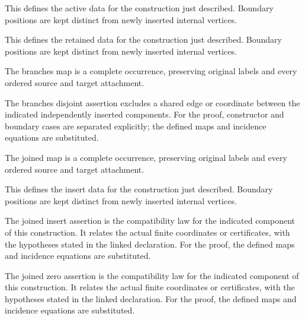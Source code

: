 This defines the active data for the construction just described. Boundary positions are kept distinct from newly inserted internal vertices.
\par{}

This defines the retained data for the construction just described. Boundary positions are kept distinct from newly inserted internal vertices.
\par{}

The branches map is a complete occurrence, preserving original labels and every ordered source and target attachment.
\par{}

The branches disjoint assertion excludes a shared edge or coordinate between the indicated independently inserted components.
For the proof, constructor and boundary cases are separated explicitly; the defined maps and incidence equations are substituted.
\par{}

The joined map is a complete occurrence, preserving original labels and every ordered source and target attachment.
\par{}

This defines the insert data for the construction just described. Boundary positions are kept distinct from newly inserted internal vertices.
\par{}

The joined insert assertion is the compatibility law for the indicated component of this construction. It relates the actual finite coordinates or certificates, with the hypotheses stated in the linked declaration.
For the proof, the defined maps and incidence equations are substituted.
\par{}

The joined zero assertion is the compatibility law for the indicated component of this construction. It relates the actual finite coordinates or certificates, with the hypotheses stated in the linked declaration.
For the proof, the defined maps and incidence equations are substituted.
\par{}


